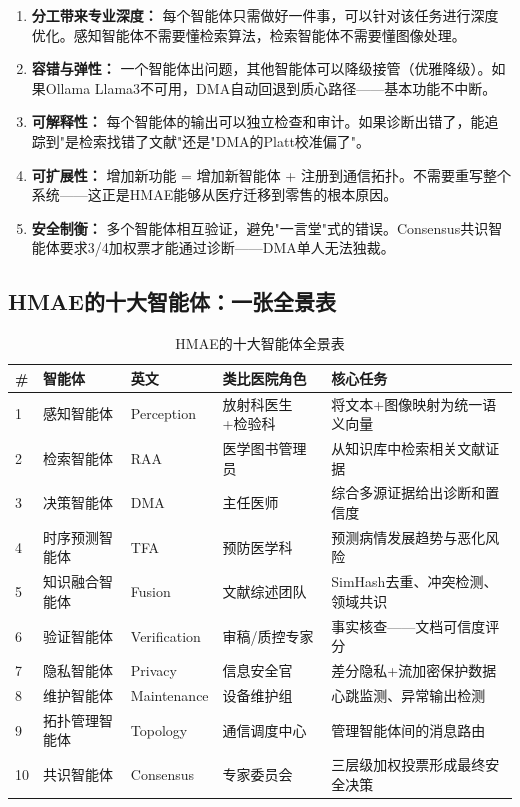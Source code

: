 \documentclass[11pt,a4paper]{ctexart}
\begin{document}
\begin{enumerate}[nosep]
\item \textbf{分工带来专业深度：} 每个智能体只需做好一件事，可以针对该任务进行深度优化。感知智能体不需要懂检索算法，检索智能体不需要懂图像处理。
\item \textbf{容错与弹性：} 一个智能体出问题，其他智能体可以降级接管（优雅降级）。如果Ollama Llama3不可用，DMA自动回退到质心路径——基本功能不中断。
\item \textbf{可解释性：} 每个智能体的输出可以独立检查和审计。如果诊断出错了，能追踪到"是检索找错了文献"还是"DMA的Platt校准偏了"。
\item \textbf{可扩展性：} 增加新功能 = 增加新智能体 + 注册到通信拓扑。不需要重写整个系统——这正是HMAE能够从医疗迁移到零售的根本原因。
\item \textbf{安全制衡：} 多个智能体相互验证，避免"一言堂"式的错误。Consensus共识智能体要求3/4加权票才能通过诊断——DMA单人无法独裁。
\end{enumerate}

\subsection{HMAE的十大智能体：一张全景表}

\begin{table}[H]
\centering
\small
\begin{tabular}{lllll}
\toprule
\textbf{\#} & \textbf{智能体} & \textbf{英文} & \textbf{类比医院角色} & \textbf{核心任务} \\
\midrule
1 & 感知智能体 & Perception & 放射科医生+检验科 & 将文本+图像映射为统一语义向量 \\
2 & 检索智能体 & RAA & 医学图书管理员 & 从知识库中检索相关文献证据 \\
3 & 决策智能体 & DMA & 主任医师 & 综合多源证据给出诊断和置信度 \\
4 & 时序预测智能体 & TFA & 预防医学科 & 预测病情发展趋势与恶化风险 \\
5 & 知识融合智能体 & Fusion & 文献综述团队 & SimHash去重、冲突检测、领域共识 \\
6 & 验证智能体 & Verification & 审稿/质控专家 & 事实核查——文档可信度评分 \\
7 & 隐私智能体 & Privacy & 信息安全官 & 差分隐私+流加密保护数据 \\
8 & 维护智能体 & Maintenance & 设备维护组 & 心跳监测、异常输出检测 \\
9 & 拓扑管理智能体 & Topology & 通信调度中心 & 管理智能体间的消息路由 \\
10 & 共识智能体 & Consensus & 专家委员会 & 三层级加权投票形成最终安全决策 \\
\bottomrule
\end{tabular}
\caption{HMAE的十大智能体全景表}
\end{table}
\end{document}
